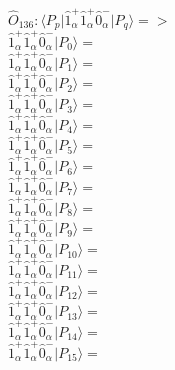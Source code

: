 \documentclass[14pt]{article}
\begin{document}
    $\hat{O}_{136}:  \langle{P_p}\vert \hat{1}_{\alpha}^{+}\hat{1}_{\alpha}^{+}\hat{0}_{\alpha}^{-} \vert{P_q}\rangle => $ \\ 
    $ \hat{1}_{\alpha}^{+}\hat{1}_{\alpha}^{+}\hat{0}_{\alpha}^{-} \vert{P_{0}}\rangle =  $ \\ 
    $ \hat{1}_{\alpha}^{+}\hat{1}_{\alpha}^{+}\hat{0}_{\alpha}^{-} \vert{P_{1}}\rangle =  $ \\ 
    $ \hat{1}_{\alpha}^{+}\hat{1}_{\alpha}^{+}\hat{0}_{\alpha}^{-} \vert{P_{2}}\rangle =  $ \\ 
    $ \hat{1}_{\alpha}^{+}\hat{1}_{\alpha}^{+}\hat{0}_{\alpha}^{-} \vert{P_{3}}\rangle =  $ \\ 
    $ \hat{1}_{\alpha}^{+}\hat{1}_{\alpha}^{+}\hat{0}_{\alpha}^{-} \vert{P_{4}}\rangle =  $ \\ 
    $ \hat{1}_{\alpha}^{+}\hat{1}_{\alpha}^{+}\hat{0}_{\alpha}^{-} \vert{P_{5}}\rangle =  $ \\ 
    $ \hat{1}_{\alpha}^{+}\hat{1}_{\alpha}^{+}\hat{0}_{\alpha}^{-} \vert{P_{6}}\rangle =  $ \\ 
    $ \hat{1}_{\alpha}^{+}\hat{1}_{\alpha}^{+}\hat{0}_{\alpha}^{-} \vert{P_{7}}\rangle =  $ \\ 
    $ \hat{1}_{\alpha}^{+}\hat{1}_{\alpha}^{+}\hat{0}_{\alpha}^{-} \vert{P_{8}}\rangle =  $ \\ 
    $ \hat{1}_{\alpha}^{+}\hat{1}_{\alpha}^{+}\hat{0}_{\alpha}^{-} \vert{P_{9}}\rangle =  $ \\ 
    $ \hat{1}_{\alpha}^{+}\hat{1}_{\alpha}^{+}\hat{0}_{\alpha}^{-} \vert{P_{10}}\rangle =  $ \\ 
    $ \hat{1}_{\alpha}^{+}\hat{1}_{\alpha}^{+}\hat{0}_{\alpha}^{-} \vert{P_{11}}\rangle =  $ \\ 
    $ \hat{1}_{\alpha}^{+}\hat{1}_{\alpha}^{+}\hat{0}_{\alpha}^{-} \vert{P_{12}}\rangle =  $ \\ 
    $ \hat{1}_{\alpha}^{+}\hat{1}_{\alpha}^{+}\hat{0}_{\alpha}^{-} \vert{P_{13}}\rangle =  $ \\ 
    $ \hat{1}_{\alpha}^{+}\hat{1}_{\alpha}^{+}\hat{0}_{\alpha}^{-} \vert{P_{14}}\rangle =  $ \\ 
    $ \hat{1}_{\alpha}^{+}\hat{1}_{\alpha}^{+}\hat{0}_{\alpha}^{-} \vert{P_{15}}\rangle =  $ \\ 
    
\end{document}
